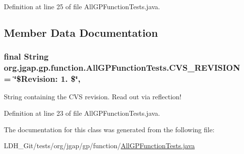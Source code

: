 Definition at line 25 of file All\-G\-P\-Function\-Tests.\-java.



\subsection{Member Data Documentation}
\hypertarget{classorg_1_1jgap_1_1gp_1_1function_1_1_all_g_p_function_tests_a2b7ed2b74e0e0da77cdc0c3288a7b797}{
\subsubsection[{C\-V\-S\-\_\-\-R\-E\-V\-I\-S\-I\-O\-N}]{\setlength{\rightskip}{0pt plus 5cm}final String org.\-jgap.\-gp.\-function.\-All\-G\-P\-Function\-Tests.\-C\-V\-S\-\_\-\-R\-E\-V\-I\-S\-I\-O\-N = \char`\"{}\$Revision\-: 1. \$\char`\"{}\hspace{0.3cm}{\ttfamily [static]}, {\ttfamily [private]}}}\label{classorg_1_1jgap_1_1gp_1_1function_1_1_all_g_p_function_tests_a2b7ed2b74e0e0da77cdc0c3288a7b797}
String containing the C\-V\-S revision. Read out via reflection! 

Definition at line 23 of file All\-G\-P\-Function\-Tests.\-java.



The documentation for this class was generated from the following file\-:\begin{DoxyCompactItemize}
\item 
L\-D\-H\-\_\-\-Git/tests/org/jgap/gp/function/\hyperlink{_all_g_p_function_tests_8java}{All\-G\-P\-Function\-Tests.\-java}\end{DoxyCompactItemize}
